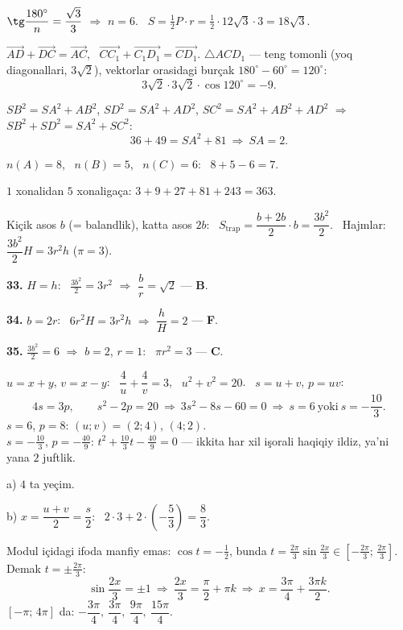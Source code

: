 $\tg\dfrac{180^\circ}n=\dfrac{\sqrt3}3$ $\Rightarrow$ $n=6$. \ $S=\frac12P\cdot r=\frac12\cdot12\sqrt3\cdot3=18\sqrt3$.

$\overrightarrow{AD}+\overrightarrow{DC}=\overrightarrow{AC}$, \ $\overrightarrow{CC_1}+\overrightarrow{C_1D_1}=\overrightarrow{CD_1}$. $\triangle ACD_1$ — teng tomonli (yoq diagonallari, $3\sqrt2$), vektorlar orasidagi burçak $180^\circ-60^\circ=120^\circ$:
\[3\sqrt2\cdot3\sqrt2\cdot\cos120^\circ=-9.\]

$SB^2=SA^2+AB^2$, $SD^2=SA^2+AD^2$, $SC^2=SA^2+AB^2+AD^2$ $\Rightarrow$ $SB^2+SD^2=SA^2+SC^2$:
\[36+49=SA^2+81\ \Rightarrow\ SA=2.\]

$n(A)=8$, \ $n(B)=5$, \ $n(C)=6$: \ $8+5-6=7$.

$1$ xonalidan $5$ xonaligaça: $3+9+27+81+243=363$.

\newpage
{}
Kiçik asos $b$ (= balandlik), katta asos $2b$: \ $S_{\text{trap}}=\dfrac{b+2b}2\cdot b=\dfrac{3b^2}2$. \ Hajmlar: $\dfrac{3b^2}2H=3r^2h$ ($\pi=3$).

\textbf{33.} $H=h$: \ $\frac{3b^2}2=3r^2$ $\Rightarrow$ $\dfrac br=\sqrt2$ — \textbf{B}.

\textbf{34.} $b=2r$: \ $6r^2H=3r^2h$ $\Rightarrow$ $\dfrac hH=2$ — \textbf{F}.

\textbf{35.} $\frac{3b^2}2=6$ $\Rightarrow$ $b=2$, $r=1$: \ $\pi r^2=3$ — \textbf{C}.

\newpage
{}
$u=x+y$, $v=x-y$: \ $\dfrac4u+\dfrac4v=3$, \ $u^2+v^2=20$. \ $s=u+v$, $p=uv$:
\[4s=3p,\qquad s^2-2p=20\ \Rightarrow\ 3s^2-8s-60=0\ \Rightarrow\ s=6\ \text{yoki}\ s=-\frac{10}3.\]
$s=6$, $p=8$: $(u;v)=(2;4)$, $(4;2)$.\\
$s=-\frac{10}3$, $p=-\frac{40}9$: $t^2+\frac{10}3t-\frac{40}9=0$ — ikkita har xil işorali haqiqiy ildiz, ya'ni yana $2$ juftlik.

a) $4$ ta yeçim.

b) $x=\dfrac{u+v}2=\dfrac s2$: \ $2\cdot3+2\cdot\left(-\dfrac53\right)=\dfrac83$.

\newpage
{}
Modul içidagi ifoda manfiy emas: $\cos t=-\frac12$, bunda $t=\frac{2\pi}3\sin\frac{2x}3\in\left[-\frac{2\pi}3;\,\frac{2\pi}3\right]$. Demak $t=\pm\frac{2\pi}3$:
\[\sin\frac{2x}3=\pm1\ \Rightarrow\ \frac{2x}3=\frac\pi2+\pi k\ \Rightarrow\ x=\frac{3\pi}4+\frac{3\pi k}2.\]
$[-\pi;\,4\pi]$ da: $-\dfrac{3\pi}4,\ \dfrac{3\pi}4,\ \dfrac{9\pi}4,\ \dfrac{15\pi}4$.

